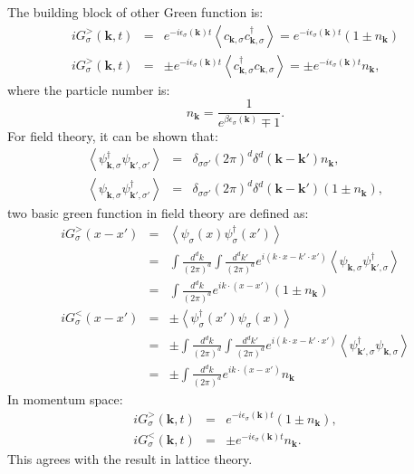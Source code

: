 \documentclass[journal=jacsat,manuscript=article]{achemso}
\begin{document}
The building block of other Green function is:
\begin{eqnarray}
	iG_{\sigma}^{>}\left(\bm{k},t\right) & = & e^{-i\epsilon_{\sigma}\left(\bm{k}\right)t}\left\langle c_{\bm{k},\sigma}c_{\bm{k},\sigma}^{\dagger}\right\rangle
	=e^{-i\epsilon_{\sigma}\left(\bm{k}\right)t}\left(1\pm n_{\bm{k}}\right) \\
	iG_{\sigma}^{>}\left(\bm{k},t\right) & = & \pm e^{-i\epsilon_{\sigma}\left(\bm{k}\right)t}\left\langle c_{\bm{k},\sigma}^{\dagger}c_{\bm{k},\sigma}\right\rangle 
	=\pm e^{-i\epsilon_{\sigma}\left(\bm{k}\right)t}n_{\bm{k}},
\end{eqnarray}
where the particle number is:
\begin{equation}
	n_{\bm{k}}=\frac{1}{e^{\beta\epsilon_{\sigma}\left(\bm{k}\right)}\mp1}.
\end{equation}
For field theory, it can be shown that:
\begin{eqnarray}
	\left\langle \psi_{\bm{k},\sigma}^{\dagger}\psi_{\bm{k}',\sigma'}\right\rangle  & = & \delta_{\sigma\sigma'}\left(2\pi\right)^{d}\delta^{d}\left(\bm{k}-\bm{k}'\right)n_{\bm{k}},\\
	\left\langle \psi_{\bm{k},\sigma}\psi_{\bm{k}',\sigma'}^{\dagger}\right\rangle  & = & \delta_{\sigma\sigma'}\left(2\pi\right)^{d}\delta^{d}\left(\bm{k}-\bm{k}'\right)\left(1\pm n_{\bm{k}}\right),
\end{eqnarray}
two basic green function in field theory are defined as:
\begin{eqnarray}
	iG_{\sigma}^{>}\left(x-x'\right)\nonumber
 	& = & \left\langle \psi_{\sigma}\left(x\right)\psi_{\sigma}^{\dagger}\left(x'\right)\right\rangle \nonumber \\
	& = & \int\frac{d^{d}k}{\left(2\pi\right)^{d}}\int\frac{d^{d}k'}{\left(2\pi\right)^{d}}e^{i\left(k\cdot x-k'\cdot x'\right)}\left\langle \psi_{\bm{k},\sigma}\psi_{\bm{k}',\sigma}^{\dagger}\right\rangle \nonumber \\
 	& = & \int\frac{d^{d}k}{\left(2\pi\right)^{d}}e^{ik\cdot\left(x-x'\right)}\left(1\pm n_{\bm{k}}\right) \\
	iG_{\sigma}^{<}\left(x-x'\right)\nonumber
 	& = & \pm\left\langle \psi_{\sigma}^{\dagger}\left(x'\right)\psi_{\sigma}\left(x\right)\right\rangle \nonumber \\
 	& = & \pm\int\frac{d^{d}k}{\left(2\pi\right)^{d}}\int\frac{d^{d}k'}{\left(2\pi\right)^{d}}e^{i\left(k\cdot x-k'\cdot x'\right)}\left\langle \psi_{\bm{k}',\sigma}^{\dagger}\psi_{\bm{k},\sigma}\right\rangle \nonumber \\
 	& = & \pm\int\frac{d^{d}k}{\left(2\pi\right)^{d}}e^{ik\cdot\left(x-x'\right)}n_{\bm{k}}
\end{eqnarray}
In momentum space:
\begin{eqnarray}
	iG_{\sigma}^{>}\left(\bm{k},t\right) & = & e^{-i\epsilon_{\sigma}\left(\bm{k}\right)t}\left(1\pm n_{\bm{k}}\right),\\
	iG_{\sigma}^{<}\left(\bm{k},t\right) & = & \pm e^{-i\epsilon_{\sigma}\left(\bm{k}\right)t}n_{\bm{k}}.
\end{eqnarray}
This agrees with the result in lattice theory.
\end{document}
